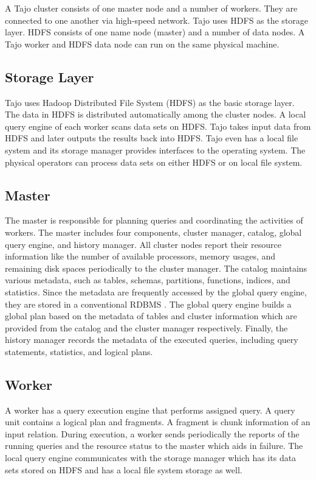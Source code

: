 \documentclass[9pt,twocolumn,twoside]{../../styles/osajnl}
\begin{document}
\noindent
A Tajo cluster consists of one master node and a number of
workers. They are connected to one another via high-speed
network. Tajo uses HDFS as the storage layer. HDFS consists of one
name node (master) and a number of data nodes. A Tajo worker and HDFS
data node can run on the same physical machine.

\subsection{Storage Layer}
Tajo uses Hadoop Distributed File System (HDFS) as the basic storage
layer. The data in HDFS is distributed automatically among the cluster
nodes. A local query engine of each worker scans data sets on
HDFS. Tajo takes input data from HDFS and later outputs the results
back into HDFS. Tajo even has a local file system and its storage
manager provides interfaces to the operating system. The physical
operators can process data sets on either HDFS or on local file
system.

\subsection{Master}

 The master is responsible for planning queries and coordinating the
 activities of workers. The master includes four components, cluster
 manager, catalog, global query engine, and history manager. All
 cluster nodes report their resource information like the number of
 available processors, memory usages, and remaining disk spaces
 periodically to the cluster manager. The catalog maintains various
 metadata, such as tables, schemas, partitions, functions, indices,
 and statistics. Since the metadata are frequently accessed by the
 global query engine, they are stored in a conventional RDBMS
 \cite{www-rdbms}. The global query engine builds a global plan based
 on the metadata of tables and cluster information which are provided
 from the catalog and the cluster manager respectively. Finally, the
 history manager records the metadata of the executed queries,
 including query statements, statistics, and logical plans.

\subsection{Worker}

A worker has a query execution engine that performs assigned query. A
query unit contains a logical plan and fragments. A fragment is chunk
information of an input relation. During execution, a worker sends
periodically the reports of the running queries and the resource
status to the master which aids in failure. The local query engine
communicates with the storage manager which has its data sets stored
on HDFS and has a local file system storage as well.
\end{document}
